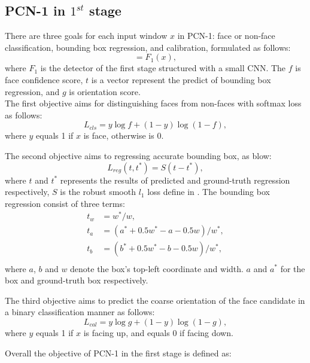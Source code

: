 \documentclass{article}
\begin{document}
\begin{multicols}{2}
\subsection{PCN-1 in $1^{st}$ stage}
There are three goals for each input window $x$ in PCN-1: face or non-face classification, bounding box regression,
and calibration, formulated as follows:
\begin{equation}
[f,t,g]=F_{1}(x), \tag{1}
\end{equation}
where $F_{1}$ is the detector of the first stage structured with a small CNN. The $f$ is face confidence score, $t$ is a vector represent the predict of bounding box regression, and $g$ is orientation score.\\
The first objective aims for distinguishing faces from non-faces with softmax loss as follows:
 \begin{equation}
L_{cls}=y\log f + (1-y)\log (1-f), \tag{2}
\end{equation}
where $y$ equals 1 if $x$ is face, otherwise is 0.
\par The second objective aims to regressing accurate bounding box, as blow:
 \begin{equation}
L_{reg}(t,t^*)=S(t-t^*), \tag{3}
\end{equation}
where $t$ and $t^*$ represents the results of predicted and ground-truth regression respectively, $S$ is the robust smooth $l_{1}$ loss define in \cite{[5]}. The bounding box regression consist of three terms:
\begin{equation}
\begin{aligned}
    t_{w} &= w^* / w, \\
    t_{a} &= (a^* + 0.5w^* -a -0.5w) / w^*, \\
    t_{b} &= (b^* + 0.5w^* - b - 0.5w) / w^*, \\
\end{aligned} \tag{4}
\end{equation}
where $a$, $b$ and $w$ denote the box's top-left coordinate and width. $a$ and $a^*$ for the box and ground-truth box respectively.
\par The third objective aims to predict the coarse orientation of the face candidate in a binary classification manner as follows:
\begin{equation}
    L_{cal} = y \log g + (1-y) \log (1-g),\tag{5}
\end{equation}
where $y$ equals 1 if $x$ is facing up, and equals 0 if facing down.
\par Overall the objective of PCN-1 in the first stage is defined as:

\end{multicols}
\end{document}
